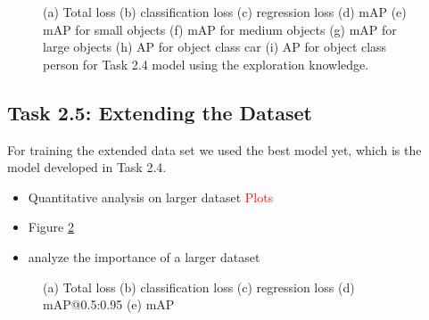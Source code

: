 \documentclass{article}
\begin{document}
\newpage
\begin{figure}[t!]
    \centering
    \subfigure[]{}
    \subfigure[]{}
    \subfigure[]{}
    \subfigure[]{}
    \subfigure[]{}
    \subfigure[]{}
    \subfigure[]{}
    \subfigure[]{}
    \subfigure[]{}
    \caption{(a) Total loss (b) classification loss (c) regression loss (d) mAP (e) mAP for small objects (f) mAP for medium objects (g) mAP for large objects (h) AP for object class car (i) AP for object class person for Task 2.4 model using the exploration knowledge.}
    \label{fig:loss-2-4}
\end{figure}
\newpage

\subsection*{Task 2.5: Extending the Dataset}

For training the extended data set we used the best model yet, which is the model developed in Task 2.4.


\begin{itemize}
    \item Quantitative analysis on larger dataset \textcolor{red}{Plots}
    \item Figure \ref{fig:loss-2-5}
    \item analyze the importance of a larger dataset
\end{itemize}

\begin{figure}[t!]
    \centering
    \subfigure[]{}
    \vspace{-0.15cm}
    \subfigure[]{}
    \subfigure[]{}
    \subfigure[]{}
    \caption{(a) Total loss (b) classification loss (c) regression loss (d) mAP@0.5:0.95 (e) mAP}
    \label{fig:loss-2-5}
\end{figure}
\end{document}
